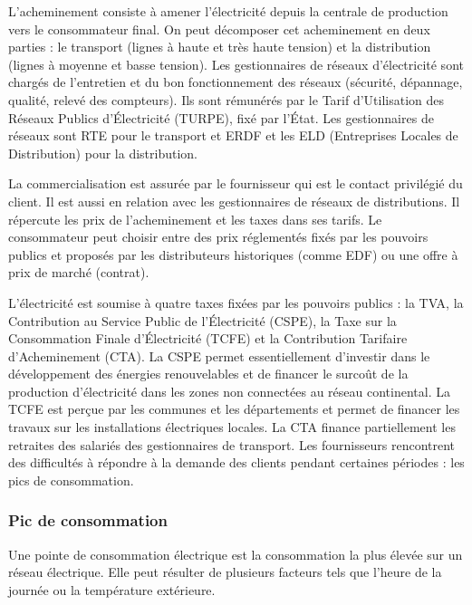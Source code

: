L'acheminement consiste à amener l'électricité depuis la centrale de production vers le consommateur final. On peut décomposer cet acheminement en deux parties : le transport (lignes à haute et très haute tension) et la distribution (lignes à moyenne et basse tension). Les gestionnaires de réseaux d'électricité sont chargés de l'entretien et du bon fonctionnement des réseaux (sécurité, dépannage, qualité, relevé des compteurs). Ils sont rémunérés par le Tarif d'Utilisation des Réseaux Publics d'Électricité (TURPE), fixé par l'État. Les gestionnaires de réseaux sont RTE pour le transport et ERDF et les ELD (Entreprises Locales de Distribution) pour la distribution.

La commercialisation est assurée par le fournisseur qui est le contact privilégié du client. Il est aussi en relation avec les gestionnaires de réseaux de distributions. Il répercute les prix de l'acheminement et les taxes dans ses tarifs. Le consommateur peut choisir entre des prix réglementés fixés par les pouvoirs publics et proposés par les distributeurs historiques (comme EDF) ou une offre à prix de marché (contrat).

L'électricité est soumise à quatre taxes fixées par les pouvoirs publics : la TVA, la Contribution au Service Public de l'Électricité (CSPE), la Taxe sur la Consommation Finale d'Électricité (TCFE) et la Contribution Tarifaire d'Acheminement (CTA). La CSPE permet essentiellement d'investir dans le développement des énergies renouvelables et de financer le surcoût de la production d'électricité dans les zones non connectées au réseau continental. La TCFE est perçue par les communes et les départements et permet de financer les travaux sur les installations électriques locales. La CTA finance partiellement les retraites des salariés des gestionnaires de transport.
Les fournisseurs rencontrent des difficultés à répondre à la demande des clients pendant certaines périodes : les pics de consommation.


	\subsubsection{Pic de consommation}
	Une pointe de consommation électrique est la consommation la plus élevée sur un réseau électrique. Elle peut résulter de plusieurs facteurs tels que l'heure de la journée ou la température extérieure.
	
